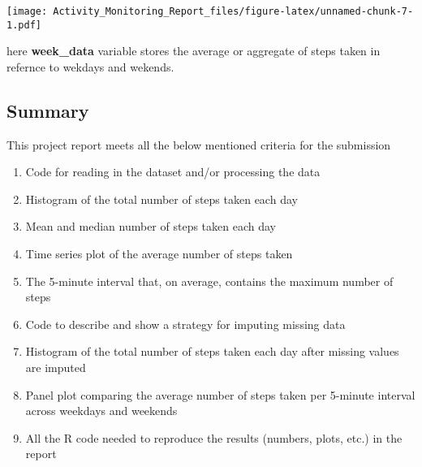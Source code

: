 \documentclass[]{article}
\providecommand{\tightlist}{%
  \setlength{\itemsep}{0pt}\setlength{\parskip}{0pt}}
\begin{document}
\texttt{[image: Activity\_Monitoring\_Report\_files/figure-latex/unnamed-chunk-7-1.pdf]}

here \textbf{week\_data} variable stores the average or aggregate of
steps taken in refernce to wekdays and wekends.

\subsection{Summary}\label{summary}

This project report meets all the below mentioned criteria for the
submission

\begin{enumerate}
\def\labelenumi{\arabic{enumi}.}
\tightlist
\item
  Code for reading in the dataset and/or processing the data
\item
  Histogram of the total number of steps taken each day
\item
  Mean and median number of steps taken each day
\item
  Time series plot of the average number of steps taken
\item
  The 5-minute interval that, on average, contains the maximum number of
  steps
\item
  Code to describe and show a strategy for imputing missing data
\item
  Histogram of the total number of steps taken each day after missing
  values are imputed
\item
  Panel plot comparing the average number of steps taken per 5-minute
  interval across weekdays and weekends
\item
  All the R code needed to reproduce the results (numbers, plots, etc.)
  in the report
\end{enumerate}
\end{document}
